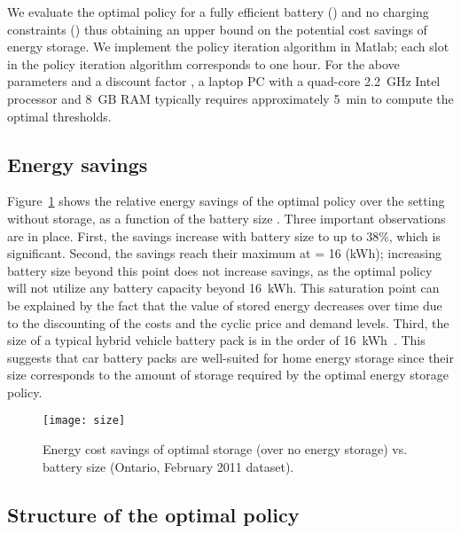 \documentclass[journal]{IEEEtran}
\newcommand\1{\mathbf{1}}
\begin{document}
We evaluate the optimal policy for a fully efficient battery ()
and no charging constraints () thus obtaining an upper bound on the
potential cost savings of energy storage.
We implement the policy iteration algorithm in Matlab; each slot in the policy iteration algorithm corresponds to one hour.
For the above parameters and a discount factor ,
a laptop PC with a quad-core 2.2~GHz Intel processor and 8~GB RAM typically requires
approximately 5~min to compute the optimal thresholds.


\subsection{Energy savings}\label{subsec:savings}

Figure~\ref{fig:size} shows the relative energy savings of the optimal policy over the setting without storage, as a function of the battery size . Three important observations are in place. First, the savings increase with battery size to up to 38\%, which is significant. Second, the savings reach their maximum at  = 16 (kWh); increasing battery size beyond this point does not increase savings, as the optimal policy will not utilize any battery capacity beyond 16~kWh. This saturation point can be explained by the fact that the value of stored energy decreases over time due to the discounting of the costs and the cyclic price and demand levels. Third, the size of a typical hybrid vehicle battery pack is in the order of 16~kWh~\cite{PWA10}. This suggests that car battery packs are well-suited for home energy storage since their size corresponds to the amount of storage required by the optimal energy storage policy.
\begin{figure}[h]
    \begin{center}
        \texttt{[image: size]}
    \end{center}
    \caption{Energy cost savings of optimal storage (over no energy storage) vs. battery size (Ontario, February 2011 dataset).}
    \label{fig:size}
\end{figure}


\subsection{Structure of the optimal policy}
\end{document}
